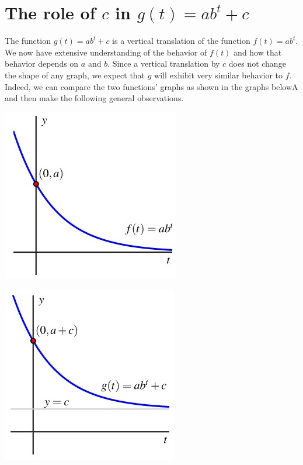 \documentclass[nooutcomes]{ximera}
\begin{document}

\section{The role of \(c\) in \(g(t) = ab^t + c\)}

The function \(g(t) = ab^t + c\) is a vertical translation of the function \(f(t) = ab^t\).  We now have extensive understanding of the behavior of \(f(t)\) and how that behavior depends on \(a\) and \(b\).  Since a vertical translation by \(c\) does not change the shape of any graph, we expect that \(g\) will exhibit very similar behavior to \(f\).  Indeed, we can compare the two functions' graphs as shown in the graphs belowA and then make the following general observations.

\begin{image}
\includegraphics{ExpText7.jpg}
\end{image}

\begin{image}
\includegraphics{ExpText8.jpg}
\end{image}
\end{document}
